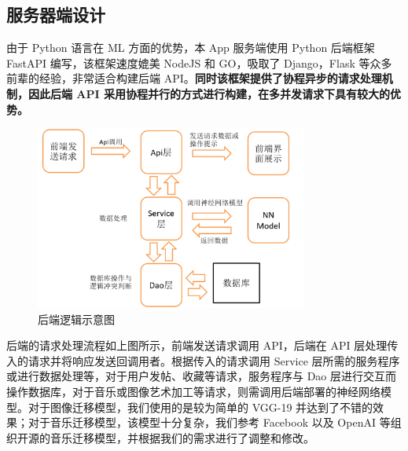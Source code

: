 \subsection{服务器端设计}

由于 Python 语言在 ML 方面的优势，本 App 服务端使用 Python 后端框架 FastAPI 编写，该框架速度媲美 NodeJS 和 GO，吸取了 Django，Flask 等众多前辈的经验，非常适合构建后端 API。\textbf{同时该框架提供了协程异步的请求处理机制，因此后端 API 采用协程并行的方式进行构建，在多并发请求下具有较大的优势。}


\begin{figure}[H]
    \centering
    \includegraphics[width=0.8\textwidth]{figures/后端逻辑.png}
    \caption{后端逻辑示意图}
    \label{fig:my_label}
\end{figure}

后端的请求处理流程如上图所示，前端发送请求调用 API，后端在 API 层处理传入的请求并将响应发送回调用者。根据传入的请求调用 Service 层所需的服务程序或进行数据处理等，对于用户发帖、收藏等请求，服务程序与 Dao 层进行交互而操作数据库，对于音乐或图像艺术加工等请求，则需调用后端部署的神经网络模型。对于图像迁移模型，我们使用的是较为简单的 VGG-19 并达到了不错的效果；对于音乐迁移模型，该模型十分复杂，我们参考 Facebook 以及 OpenAI 等组织开源的音乐迁移模型，并根据我们的需求进行了调整和修改。
